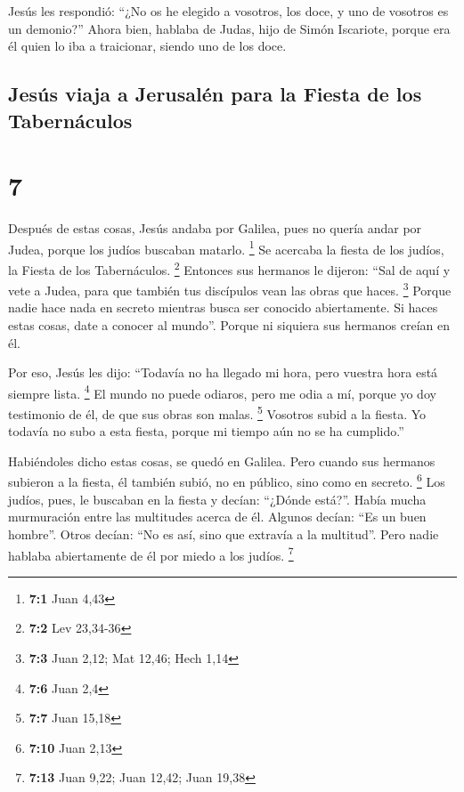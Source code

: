  Jesús les respondió: ``¿No os he elegido a vosotros, los
doce, y uno de vosotros es un demonio?''  Ahora bien,
hablaba de Judas, hijo de Simón Iscariote, porque era él quien lo iba a
traicionar, siendo uno de los doce.

\hypertarget{jesuxfas-viaja-a-jerusaluxe9n-para-la-fiesta-de-los-tabernuxe1culos}{%
\subsection{Jesús viaja a Jerusalén para la Fiesta de los
Tabernáculos}\label{jesuxfas-viaja-a-jerusaluxe9n-para-la-fiesta-de-los-tabernuxe1culos}}

\hypertarget{section-6}{%
\section{7}\label{section-6}}

 Después de estas cosas, Jesús andaba por Galilea, pues no
quería andar por Judea, porque los judíos buscaban matarlo. \footnote{\textbf{7:1}
  Juan 4,43}  Se acercaba la fiesta de los judíos, la
Fiesta de los Tabernáculos. \footnote{\textbf{7:2} Lev 23,34-36}
 Entonces sus hermanos le dijeron: ``Sal de aquí y vete a
Judea, para que también tus discípulos vean las obras que haces.
\footnote{\textbf{7:3} Juan 2,12; Mat 12,46; Hech 1,14} 
Porque nadie hace nada en secreto mientras busca ser conocido
abiertamente. Si haces estas cosas, date a conocer al mundo''.
 Porque ni siquiera sus hermanos creían en él.

 Por eso, Jesús les dijo: ``Todavía no ha llegado mi hora,
pero vuestra hora está siempre lista. \footnote{\textbf{7:6} Juan 2,4}
 El mundo no puede odiaros, pero me odia a mí, porque yo
doy testimonio de él, de que sus obras son malas. \footnote{\textbf{7:7}
  Juan 15,18}  Vosotros subid a la fiesta. Yo todavía no
subo a esta fiesta, porque mi tiempo aún no se ha cumplido.''

 Habiéndoles dicho estas cosas, se quedó en Galilea.
 Pero cuando sus hermanos subieron a la fiesta, él
también subió, no en público, sino como en secreto. \footnote{\textbf{7:10}
  Juan 2,13}  Los judíos, pues, le buscaban en la fiesta
y decían: ``¿Dónde está?''.  Había mucha murmuración
entre las multitudes acerca de él. Algunos decían: ``Es un buen
hombre''. Otros decían: ``No es así, sino que extravía a la multitud''.
 Pero nadie hablaba abiertamente de él por miedo a los
judíos. \footnote{\textbf{7:13} Juan 9,22; Juan 12,42; Juan 19,38}

